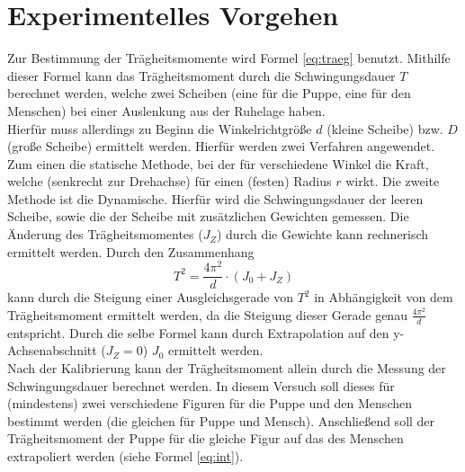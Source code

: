 \section{Experimentelles Vorgehen}
Zur Bestimmung der Trägheitsmomente wird Formel \ref{eq:traeg} benutzt. Mithilfe dieser Formel kann das Trägheitsmoment durch die Schwingungsdauer $T$ berechnet werden, welche zwei Scheiben (eine für die Puppe, eine für den Menschen) bei einer Auslenkung aus der Ruhelage haben.\\
Hierfür muss allerdings zu Beginn die Winkelrichtgröße $d$ (kleine Scheibe) bzw. $D$ (große Scheibe) ermittelt werden. Hierfür werden zwei Verfahren angewendet. Zum einen die statische Methode, bei der für verschiedene Winkel die Kraft, welche (senkrecht zur Drehachse) für einen (festen) Radius $r$ wirkt. Die zweite Methode ist die Dynamische. Hierfür wird die Schwingungsdauer der leeren Scheibe, sowie die der Scheibe mit zusätzlichen Gewichten gemessen. Die Änderung des Trägheitsmomentes ($J_Z$) durch die Gewichte kann rechnerisch ermittelt werden. Durch den Zusammenhang
\begin{equation}
T^2 = \frac{4\pi^2}{d} \cdot (J_0 + J_Z)
\end{equation}
kann durch die Steigung einer Ausgleichsgerade von $T^2$ in Abhängigkeit von dem Trägheitsmoment ermittelt werden, da die Steigung dieser Gerade genau $\frac{4\pi^2}{d}$ entspricht. Durch die selbe Formel kann durch Extrapolation auf den y-Achsenabschnitt ($J_Z = 0$)  $J_0$ ermittelt werden.\\
Nach der Kalibrierung kann der Trägheitsmoment allein durch die Messung der Schwingungsdauer berechnet werden. In diesem Versuch soll dieses für (mindestens) zwei verschiedene Figuren für die Puppe und den Menschen bestimmt werden (die gleichen für Puppe und Mensch). Anschließend soll der Trägheitsmoment der Puppe für die gleiche Figur auf das des Menschen extrapoliert werden (siehe Formel \ref{eq:int}).





